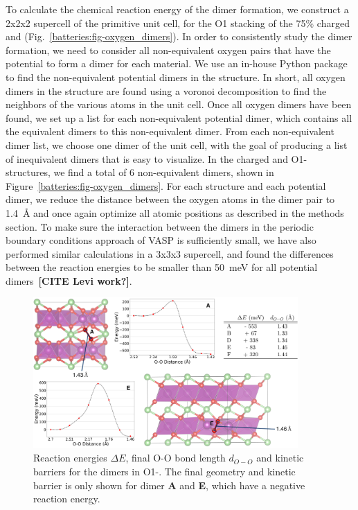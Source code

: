 \begin{refsection}
To calculate the chemical reaction energy of the dimer formation, we construct a 2x2x2 supercell of the primitive unit cell, for the O1 stacking of the 75\% charged  and  (Fig.~\ref{batteries:fig-oxygen_dimers}). In order to consistently study the dimer formation, we need to consider all non-equivalent oxygen pairs that have the potential to form a dimer for each material. We use an in-house Python package  to find the non-equivalent potential dimers in the structure. In short, all oxygen dimers in the structure are found using a voronoi decomposition to find the neighbors of the various atoms in the unit cell. Once all oxygen dimers have been found, we set up a list for each non-equivalent potential dimer, which contains all the equivalent dimers to this non-equivalent dimer. From each non-equivalent dimer list, we choose one dimer of the unit cell, with the goal of producing a list of inequivalent dimers that is easy to visualize. In the charged  and O1- structures, we find a total of 6 non-equivalent dimers, shown in Figure~\ref{batteries:fig-oxygen_dimers}. For each structure and each potential dimer, we reduce the distance between the oxygen atoms in the dimer pair to 1.4~\si{\angstrom} and once again optimize all atomic positions as described in the methods section. To make sure the interaction between the dimers in the periodic boundary conditions approach of VASP is sufficiently small, we have also performed similar calculations in a 3x3x3 supercell, and found the differences between the reaction energies to be smaller than 50~\si{\milli\electronvolt} for all potential dimers~\textbf{[CITE Levi work?]}.

\begin{figure}[h]
\includegraphics[width=0.9\textwidth]{Figures/batteries/dimer_energetics.png}
\caption{Reaction energies $\Delta E$, final O-O bond length $d_{O-O}$ and kinetic barriers for the dimers in O1-. The final geometry and kinetic barrier is only shown for dimer \textbf{A} and \textbf{E}, which have a negative reaction energy.}
\label{batteries:fig-Mn_dimers}
\end{figure}


\end{refsection}
